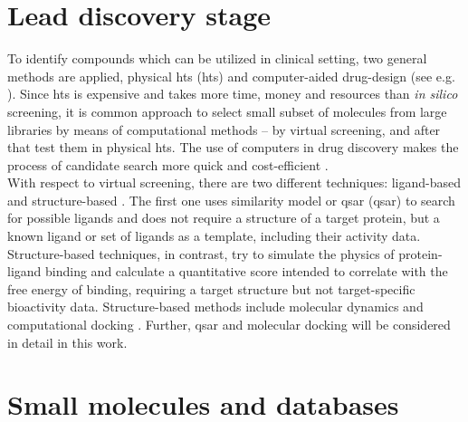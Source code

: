 \section{Lead discovery stage}\label{lead_disc}

To identify compounds which can be utilized in clinical setting, two general methods are applied, physical \acrlong{hts} (\acrshort{hts}) and computer-aided drug-design (see e.g. \cite{Luxminarayan2019TheProcess}). 
Since \acrshort{hts} is expensive and takes more time, money and resources than \textit{in silico }screening, it is common approach to select small subset of molecules from large libraries by means of computational methods -- by virtual screening, and after that test them in physical \acrshort{hts}.
The use of computers in drug discovery makes the process of candidate search more quick and cost-efficient \cite{McInnes2007VirtualDiscovery}.\\

With respect to virtual screening, there are two different techniques: ligand-based and structure-based \cite{Blass2015BasicDevelopment}.
The first one uses similarity model or \acrlong{qsar} (\acrshort{qsar}) to search for possible ligands and does not require a structure of a target protein, but a known ligand or set of ligands as a template, including their activity data.
Structure-based techniques, in contrast, try to simulate the physics of protein-ligand binding and calculate a quantitative score intended to correlate with the free energy of binding, requiring a target structure but not target-specific bioactivity data.
Structure-based methods include molecular dynamics and computational docking {\cite{Graff2021AcceleratingLearning}}. Further, \acrshort{qsar} and molecular docking will be considered in detail in this work.\\

\section{Small molecules and databases}

